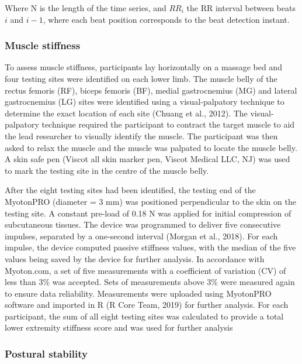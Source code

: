 \documentclass[
]{frontiersHLTH}
\begin{document}
Where N is the length of the time series, and \(RR_i\) the RR interval
between beats \(i\) and \(i-1\), where each beat position corresponds to
the beat detection instant.

\hypertarget{muscle-stiffness}{%
\subsubsection{Muscle stiffness}\label{muscle-stiffness}}

To assess muscle stiffness, participants lay horizontally on a massage
bed and four testing sites were identified on each lower limb. The
muscle belly of the rectus femoris (RF), biceps femoris (BF), medial
gastrocnemius (MG) and lateral gastrocnemius (LG) sites were identified
using a visual-palpatory technique to determine the exact location of
each site (Chuang et al., 2012). The visual-palpatory technique required
the participant to contract the target muscle to aid the lead researcher
to visually identify the muscle. The participant was then asked to relax
the muscle and the muscle was palpated to locate the muscle belly. A
skin safe pen (Viscot all skin marker pen, Viscot Medical LLC, NJ) was
used to mark the testing site in the centre of the muscle belly.

After the eight testing sites had been identified, the testing end of
the MyotonPRO (diameter = 3 mm) was positioned perpendicular to the skin
on the testing site. A constant pre-load of 0.18 N was applied for
initial compression of subcutaneous tissues. The device was programmed
to deliver five consecutive impulses, separated by a one-second interval
(Morgan et al., 2018). For each impulse, the device computed passive
stiffness values, with the median of the five values being saved by the
device for further analysis. In accordance with Myoton.com, a set of
five measurements with a coefficient of variation (CV) of less than 3\%
was accepted. Sets of measurements above 3\% were measured again to
ensure data reliability. Measurements were uploaded using MyotonPRO
software and imported in R (R Core Team, 2019) for further analysis. For
each participant, the sum of all eight testing sites was calculated to
provide a total lower extremity stiffness score and was used for further
analysis

\hypertarget{postural-stability-1}{%
\subsubsection{Postural stability}\label{postural-stability-1}}
\end{document}
